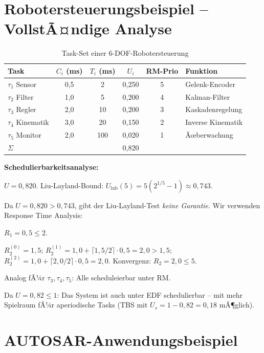 ﻿\documentclass[a4paper,12pt]{report}
\theoremstyle{definition}
\begin{document}
\section{Robotersteuerungsbeispiel -- VollstÃ¤ndige Analyse}

\begin{table}[H]
	\centering
	\caption{Task-Set einer 6-DOF-Robotersteuerung}
	\begin{tabular}{lccccl}
		\toprule
		Task & $C_i$ (ms) & $T_i$ (ms) & $U_i$ & RM-Prio & Funktion \\
		\midrule
		$\tau_1$ Sensor     & 0{,}5  & 2    & 0{,}250 & 5 & Gelenk-Encoder \\
		$\tau_2$ Filter     & 1{,}0  & 5    & 0{,}200 & 4 & Kalman-Filter \\
		$\tau_3$ Regler     & 2{,}0  & 10   & 0{,}200 & 3 & Kaskadenregelung \\
		$\tau_4$ Kinematik  & 3{,}0  & 20   & 0{,}150 & 2 & Inverse Kinematik \\
		$\tau_5$ Monitor    & 2{,}0  & 100  & 0{,}020 & 1 & Ãœberwachung \\
		\midrule
		$\Sigma$ & & & 0{,}820 & & \\
		\bottomrule
	\end{tabular}
\end{table}

\textbf{Schedulierbarkeitsanalyse:}

$U = 0{,}820$. Liu-Layland-Bound: $U_{\text{lub}}(5) = 5(2^{1/5}-1) \approx 0{,}743$.

Da $U = 0{,}820 > 0{,}743$, gibt der Liu-Layland-Test \emph{keine Garantie}.
Wir verwenden Response Time Analysis:

$R_1 = 0{,}5 \leq 2$. \checkmark

$R_2^{(0)} = 1{,}5$; $R_2^{(1)} = 1{,}0 + \lceil 1{,}5/2 \rceil \cdot 0{,}5 = 2{,}0 > 1{,}5$;
$R_2^{(2)} = 1{,}0 + \lceil 2{,}0/2 \rceil \cdot 0{,}5 = 2{,}0$. Konvergenz: $R_2 = 2{,}0 \leq 5$. \checkmark

Analog fÃ¼r $\tau_3, \tau_4, \tau_5$: Alle scheduleierbar unter RM.

Da $U = 0{,}82 \leq 1$: Das System ist auch unter EDF schedulierbar -- mit mehr
Spielraum fÃ¼r aperiodische Tasks (TBS mit $U_s = 1-0{,}82 = 0{,}18$ mÃ¶glich).

\section{AUTOSAR-Anwendungsbeispiel}
\end{document}
